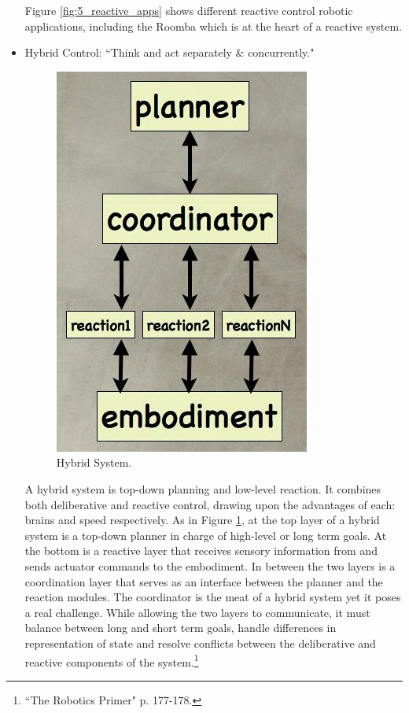 \begin{itemize}
Figure \ref{fig:5_reactive_apps} shows different reactive control robotic applications, including the Roomba which is at the heart of a reactive system. 


\item Hybrid Control: ``Think and act separately \& concurrently."

\begin{figure}[!h]
\centering
\includegraphics[height=0.4\textwidth]{figures/5_hybrid.jpg}
\caption{Hybrid System.}
\label{fig:5_hybrid}
\end{figure}

A hybrid system is top-down planning and low-level reaction. It combines both deliberative and reactive control, drawing upon the advantages of each: brains and speed respectively. As in Figure \ref{fig:5_hybrid}, at the top layer of a hybrid system is a top-down planner in charge of high-level or long term goals. At the bottom is a reactive layer that receives sensory information from and sends actuator commands to the embodiment. In between the two layers is a coordination layer that serves as an interface between the planner and the reaction modules. The coordinator is the meat of a hybrid system yet it poses a real challenge. While allowing the two layers to communicate, it must balance between long and short term goals, handle differences in representation of state and resolve conflicts between the deliberative and reactive components of the system.\footnote{``The Robotics Primer" p. 177-178.}



\end{itemize}

